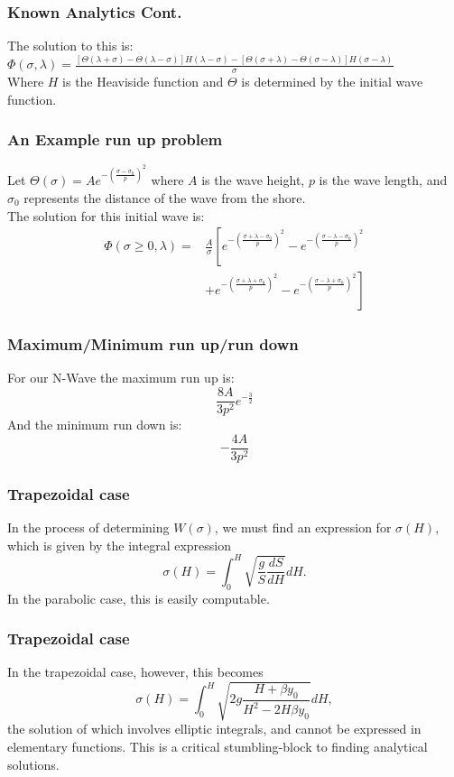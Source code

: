 \documentclass[xcolor=dvipsnames]{beamer}
\begin{document}
\begin{frame}
\frametitle{Known Analytics Cont.}
The solution to this is:\\\vspace{7mm}
$\Phi(\sigma,\lambda)=\frac{[\Theta(\lambda+\sigma)-\Theta(\lambda-\sigma)]H(\lambda-\sigma)-[\Theta(\sigma+\lambda)-\Theta(\sigma-\lambda)]H(\sigma-\lambda)}{\sigma}$\\\vspace{3mm}
Where $H$ is the Heaviside function and $\Theta$ is determined by the initial wave function.
\end{frame}

\begin{frame}
\frametitle{An Example run up problem}
Let $\Theta(\sigma)=A e^{-(\frac{\sigma-\sigma_0}{p})^2}$ where $A$ is the wave height, $p$ is the wave length, and $\sigma_0$ represents the distance of the wave from the shore.\\
The solution for this initial wave is:\\
\begin{align*}
\Phi(\sigma\geq0,\lambda)=&\frac{A}{\sigma} \left[ e^{-(\frac{\sigma+\lambda-\sigma_0}{p})^2}-e^{-(\frac{\sigma-\lambda-\sigma_0}{p})^2} \right. \\
&\left. +e^{-(\frac{\sigma+\lambda+\sigma_0}{p})^2}-e^{-(\frac{\sigma-\lambda+\sigma_0}{p})^2} \right]
\end{align*}
\end{frame}

\begin{frame}
\frametitle{Maximum/Minimum run up/run down}

For our N-Wave the maximum run up is:\[
\frac{8A}{3p^2}e^{-\frac{3}{2}}
\]
And the minimum run down is:\[
-\frac{4A}{3p^2}
\]
\end{frame}

\begin{frame}
\frametitle{Trapezoidal case}
In the process of determining $W(\sigma)$, we must find an expression for $\sigma(H)$, which is given by the integral expression
\[
\sigma(H) = \int_0^H \sqrt{\frac{g}{S} \frac{dS}{dH}}dH.
\]
In the parabolic case, this is easily computable. 
\end{frame}
\begin{frame}
\frametitle{Trapezoidal case}
In the trapezoidal case, however, this becomes
\[
\sigma(H) = \int_0^H \sqrt{2g\frac{H + \beta y_0}{H^2 - 2H \beta y_0}} dH,
\]
the solution of which involves elliptic integrals, and cannot be expressed in elementary functions. This is a critical stumbling-block to finding analytical solutions.
\end{frame}
\end{document}
